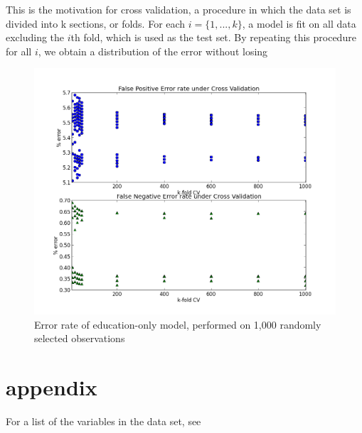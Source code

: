 \documentclass[11pt]{article}
\begin{document}
This is the motivation for cross validation, a procedure in which the data set is divided into k sections, or folds. For each $i = \{1,...,k\}$, a model is fit on all data excluding the $i$th fold, which is used as the test set. By repeating this procedure for all $i$, we obtain a distribution of the error without losing 
\begin{figure}[H]
\centering
\includegraphics[width = 12cm]{CV_5K_1Kfold.png}
\caption{Error rate of education-only model, performed on 1,000 randomly selected observations}
\end{figure}


\section{appendix}
For a list of the variables in the data set, see 
\end{document}
